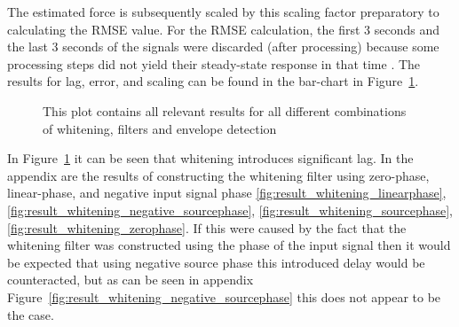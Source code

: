 The estimated force is subsequently scaled by this scaling factor preparatory to calculating the RMSE value. For the RMSE calculation, the first 3 seconds and the last 3 seconds of the signals were discarded (after processing) because some processing steps did not yield their steady-state response in that time \cite{transient_response}. The results for lag, error, and scaling can be found in the bar-chart in Figure~\ref{fig:result_all_lagerrorscaling}. 

\begin{figure}[h!t]
	\begin{center}
	\noindent{}
	\end{center}
	\caption{This plot contains all relevant results for all different combinations of whitening, filters and envelope detection}
	\label{fig:result_all_lagerrorscaling}
\end{figure}

In Figure~\ref{fig:result_all_lagerrorscaling} it can be seen that whitening introduces significant lag. In the appendix are the results of constructing the whitening filter using zero-phase, linear-phase, and negative input signal phase \ref{fig:result_whitening_linearphase}, \ref{fig:result_whitening_negative_sourcephase}, \ref{fig:result_whitening_sourcephase}, \ref{fig:result_whitening_zerophase}. If this were caused by the fact that the whitening filter was constructed using the phase of the input signal then it would be expected that using negative source phase this introduced delay would be counteracted, but as can be seen in appendix Figure~\ref{fig:result_whitening_negative_sourcephase} this does not appear to be the case. 

